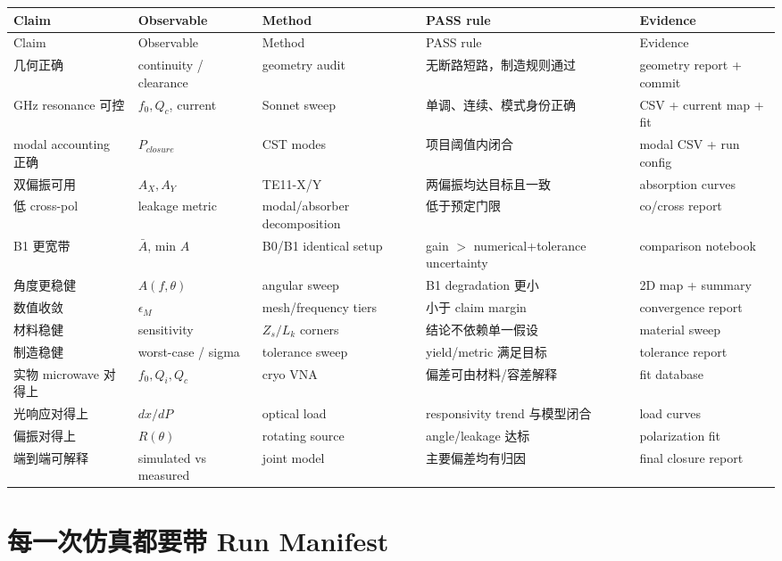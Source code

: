 \documentclass[11pt,a4paper,openany]{ctexrep}
\begin{document}
\small
\begin{longtable}{p{2.3cm}p{3.0cm}p{2.6cm}p{3.0cm}p{3.0cm}}
\toprule
Claim & Observable & Method & PASS rule & Evidence \\
\midrule
\endfirsthead
\toprule
Claim & Observable & Method & PASS rule & Evidence \\
\midrule
\endhead
几何正确 & continuity / clearance & geometry audit & 无断路短路，制造规则通过 & geometry report + commit \\
GHz resonance 可控 & $f_0,Q_c$, current & Sonnet sweep & 单调、连续、模式身份正确 & CSV + current map + fit \\
modal accounting 正确 & $P_{closure}$ & CST modes & 项目阈值内闭合 & modal CSV + run config \\
双偏振可用 & $A_X,A_Y$ & TE11-X/Y & 两偏振均达目标且一致 & absorption curves \\
低 cross-pol & leakage metric & modal/absorber decomposition & 低于预定门限 & co/cross report \\
B1 更宽带 & $\bar A$, min $A$ & B0/B1 identical setup & gain $>$ numerical+tolerance uncertainty & comparison notebook \\
角度更稳健 & $A(f,\theta)$ & angular sweep & B1 degradation 更小 & 2D map + summary \\
数值收敛 & $\epsilon_M$ & mesh/frequency tiers & 小于 claim margin & convergence report \\
材料稳健 & sensitivity & $Z_s/L_k$ corners & 结论不依赖单一假设 & material sweep \\
制造稳健 & worst-case / sigma & tolerance sweep & yield/metric 满足目标 & tolerance report \\
实物 microwave 对得上 & $f_0,Q_i,Q_c$ & cryo VNA & 偏差可由材料/容差解释 & fit database \\
光响应对得上 & $dx/dP$ & optical load & responsivity trend 与模型闭合 & load curves \\
偏振对得上 & $R(\theta)$ & rotating source & angle/leakage 达标 & polarization fit \\
端到端可解释 & simulated vs measured & joint model & 主要偏差均有归因 & final closure report \\
\bottomrule
\end{longtable}
\normalsize

\section{每一次仿真都要带 Run Manifest}
\end{document}
